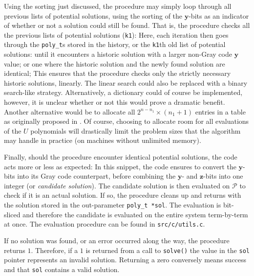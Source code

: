 Using the sorting just discussed, the procedure may simply loop through all previous lists of potential solutions, using the sorting of the $\mathbf{y}$-bits as an indicator of whether or not a solution could still be found. That is, the procedure checks all the previous lists of potential solutions (\texttt{k1}):
Here, each iteration then goes through the \texttt{poly\_t}s stored in the history, or the \texttt{k1}th old list of potential solutions:
until it encounters a historic solution with a larger non-Gray code $\mathbf{y}$ value; 
or one where the historic solution and the newly found solution are identical;
This ensures that the procedure checks only the strictly necessary historic solutions, linearly. The linear search could also be replaced with a binary search-like strategy. Alternatively, a dictionary could of course be implemented, however, it is unclear whether or not this would prove a dramatic benefit. Another alternative would be to allocate all $2^{n - n_1} \times (n_1 + 1)$ entries in a table as originally proposed in \cite{eurocrypt-2021-30841}. Of course, choosing to allocate room for all evaluations of the $U$ polynomials will drastically limit the problem sizes that the algorithm may handle in practice (on machines without unlimited memory).

Finally, should the procedure encounter identical potential solutions, the code acts more or less as expected:
In this snippet, the code ensures to convert the $\mathbf{y}$-bits into its Gray code counterpart, before combining the $\mathbf{y}$- and $\mathbf{z}$-bits into one integer (or \textit{candidate solution}). The candidate solution is then evaluated on $\mathcal{P}$ to check if it is an actual solution. If so, the procedure cleans up and returns with the solution stored in the out-parameter \texttt{poly\_t *sol}. The evaluation is bit-sliced and therefore the candidate is evaluated on the entire system term-by-term at once. The evaluation procedure can be found in \texttt{src/c/utils.c}.

If no solution was found, or an error occurred along the way, the procedure returns $1$. Therefore, if a $1$ is returned from a call to \texttt{solve()} the value in the \texttt{sol} pointer represents an invalid solution. Returning a zero conversely means success and that \texttt{sol} contains a valid solution.

